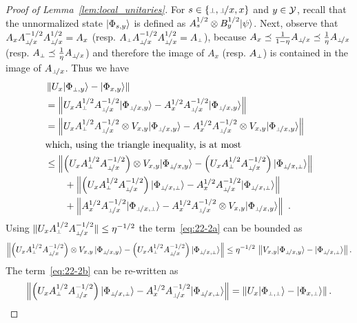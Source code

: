 \begin{proof}[Proof of Lemma~\ref{lem:local_unitaries}]
For $s \in \{\dummy, \dummyx, x\}$ and $y \in \mathcal{Y}$, recall that the unnormalized state ${|\Phi_{s,y}\rangle}$ is defined as $A_s^{1/2} \otimes B_y^{1/2} {|\psi\rangle}$. Next, observe that $A_x A_{\dummyx}^{-1/2} A_\dummyx^{1/2} = A_x$ (resp. $A_\dummy A_{\dummyx}^{-1/2} A_\dummyx^{1/2} = A_\dummy$), because $A_x \preceq \frac{1}{1 - \eta} A_\dummyx \preceq \frac{1}{\eta} A_\dummyx$ (resp. $A_\dummy \preceq \frac{1}{\eta} A_\dummyx$) and therefore the image of $A_x$ (resp. $A_\dummy$) is contained in the image of $A_\dummyx$. Thus we have
\begin{align}
	&\left \| U_x \ket{\Phi_{\dummy,y}} - \ket{\Phi_{x,y}} \right \| \notag \\
	&= \left \| U_x A_\dummy^{1/2} A_\dummyx^{-1/2} \ket{\Phi_{\dummyx,y}} - A_{x}^{1/2} A_{\dummy\! /x}^{-1/2}  \ket{\Phi_{\dummyx,y}} \right \| \notag \\
	&= \left \| U_x A_\dummy^{1/2} A_\dummyx^{-1/2} \otimes V_{x,y} \ket{\Phi_{\dummyx,y}} - A_{x}^{1/2} A_{\dummy\! /x}^{-1/2} \otimes V_{x,y}  \ket{\Phi_{\dummyx,y}} \right \| \notag \\
	\intertext{which, using the triangle inequality, is at most}
&\leq  \left \| \left ( U_x A_\dummy^{1/2} A_\dummyx^{-1/2} \right ) \otimes V_{x,y} \ket{\Phi_{\dummyx,y}} - \left ( U_x A_\dummy^{1/2} A_\dummyx^{-1/2} \right ) \ket{\Phi_{\dummyx, \dummy}} \right \|  \label{eq:22-2a}\\
& \qquad +  \left \| \left ( U_x A_\dummy^{1/2} A_\dummyx^{-1/2} \right ) \ket{\Phi_{\dummyx,\dummy}} - A_x^{1/2} A_\dummyx^{-1/2}  \ket{\Phi_{\dummyx,\dummy}} \right \| \label{eq:22-2b}\\
& \qquad + \left \| A_x^{1/2} A_\dummyx^{-1/2} \ket{\Phi_{\dummyx,\dummy}} - A_x^{1/2} A_\dummyx^{-1/2}  \otimes V_{x,y} \ket{\Phi_{\dummyx,y}} \right \|~.\label{eq:22-2c}
\end{align}
Using $\|U_x A_\dummy^{1/2} A_\dummyx^{-1/2}\|\leq \eta^{-1/2}$ the term~\eqref{eq:22-2a} can be bounded as
$$
\left \| \left ( U_x A_\dummy^{1/2} A_\dummyx^{-1/2} \right ) \otimes V_{x,y}\, \ket{\Phi_{\dummyx,y}} - \left ( U_x A_\dummy^{1/2} A_\dummyx^{-1/2} \right ) \ket{\Phi_{\dummyx,\dummy}} \right \|  \leq \eta^{-1/2} \, \left \|  V_{x,y} \ket{\Phi_{\dummyx,y}} - \ket{\Phi_{\dummyx,\dummy}} \right \|.
$$
The term~\eqref{eq:22-2b} can be re-written as
$$
\left \| \left ( U_x A_\dummy^{1/2} A_\dummyx^{-1/2} \right ) \ket{\Phi_{\dummyx,\dummy}} - A_x^{1/2} A_\dummyx^{-1/2}  \ket{\Phi_{\dummyx,\dummy}} \right \| = \left \| U_x \ket{\Phi_{\dummy,\dummy}} - \ket{\Phi_{x,\dummy}} \right \|.
$$

\end{proof}
